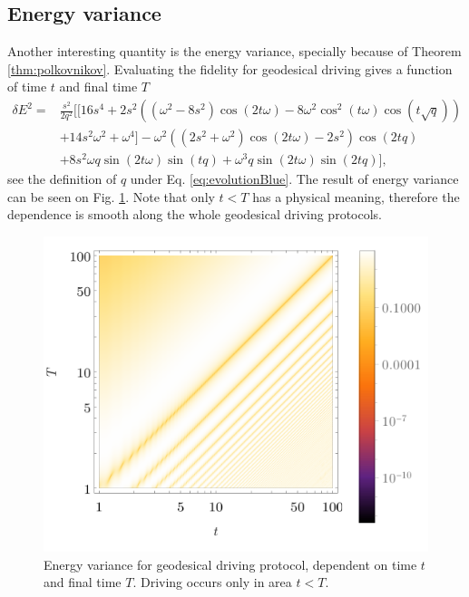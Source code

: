 \subsection{Energy variance}
Another interesting quantity is the energy variance, specially because of Theorem \ref{thm:polkovnikov}. Evaluating the fidelity for geodesical driving gives a function of time $t$ and final time $T$
\begin{equation}
    \begin{split}        
        \delta E^2 =& \frac{s^2}{2 q^2}\Bigg[\Big[16 s^4+2 s^2 \left(\left(\omega ^2-8 s^2\right) \cos (2 t \omega )-8 \omega ^2 \cos ^2(t \omega ) \cos \left(t \sqrt{q}\right)\right)\\
        &+14 s^2 \omega ^2+\omega ^4\Big] -\omega ^2 \left(\left(2 s^2+\omega ^2\right) \cos (2 t \omega )-2 s^2\right) \cos \left(2 t q\right)\\
        & +8 s^2 \omega  q \sin (2 t \omega ) \sin \left(t q\right) + \omega ^3 q \sin (2 t \omega ) \sin \left(2 t q\right) \Bigg],
\end{split}
\end{equation}
see the definition of $q$ under Eq. \ref{eq:evolutionBlue}. The result of energy variance can be seen on Fig. \ref{fig:densVar}. Note that only $t<T$ has a physical meaning, therefore the dependence is smooth along the whole geodesical driving protocols.

\begin{figure}[H]
    \centering
    \includegraphics[scale=1.2]{../img/densVar.pdf}
    \caption{Energy variance for geodesical driving protocol, dependent on time $t$ and final time $T$. Driving occurs only in area $t<T$.}
    \label{fig:densVar}
\end{figure}

